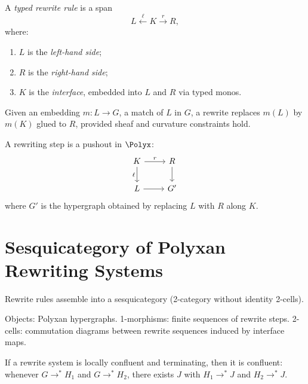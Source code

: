 \begin{definition}
A \emph{typed rewrite rule} is a span
\[
L \xleftarrow{\;\ell\;} K \xrightarrow{\;r\;} R,
\]
where:
\begin{enumerate}
  \item $L$ is the \emph{left-hand side};
  \item $R$ is the \emph{right-hand side};
  \item $K$ is the \emph{interface}, embedded into $L$ and $R$ via typed monos.
\end{enumerate}
\end{definition}

Given an embedding $m : L \to G$, a match of $L$ in $G$, a rewrite replaces
$m(L)$ by $m(K)$ glued to $R$, provided sheaf and curvature constraints hold.

\begin{definition}
A rewriting step is a pushout in $\Polyx$:
\[
\begin{tikzcd}
K \ar[r,"r"] \ar[d,"\ell"'] & R \ar[d] \\
L \ar[r] & G'
\end{tikzcd}
\]
where $G'$ is the hypergraph obtained by replacing $L$ with $R$ along $K$.
\end{definition}

\section{Sesquicategory of Polyxan Rewriting Systems}

Rewrite rules assemble into a sesquicategory (2-category without identity
2-cells).

\begin{definition}
Objects: Polyxan hypergraphs.  
1-morphisms: finite sequences of rewrite steps.  
2-cells: commutation diagrams between rewrite sequences induced by interface
maps.
\end{definition}

\begin{theorem}
If a rewrite system is locally confluent and terminating, then it is confluent:
whenever $G \to^\ast H_1$ and $G \to^\ast H_2$, there exists $J$ with
$H_1 \to^\ast J$ and $H_2 \to^\ast J$.
\end{theorem}

